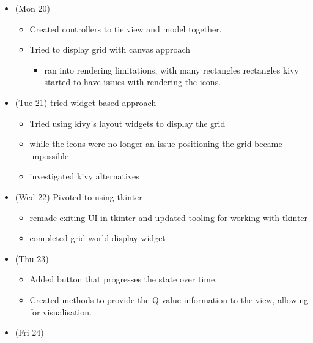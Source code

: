 \begin{itemize}
  \tightlist
  \item
        (Mon 20)

        \begin{itemize}
          \tightlist
          \item
                Created controllers to tie view and model together.
          \item
                Tried to display grid with canvas approach

                \begin{itemize}
                  \tightlist
                  \item
                        ran into rendering limitations, with many rectangles rectangles
                        kivy started to have issues with rendering the icons.
                \end{itemize}
        \end{itemize}
  \item
        (Tue 21) tried widget based approach

        \begin{itemize}
          \tightlist
          \item
                Tried using kivy's layout widgets to display the grid
          \item
                while the icons were no longer an issue positioning the grid became
                impossible
          \item
                investigated kivy alternatives
        \end{itemize}
  \item
        (Wed 22) Pivoted to using tkinter

        \begin{itemize}
          \tightlist
          \item
                remade exiting UI in tkinter and updated tooling for working with
                tkinter
          \item
                completed grid world display widget
        \end{itemize}
  \item
        (Thu 23)

        \begin{itemize}
          \tightlist
          \item
                Added button that progresses the state over time.
          \item
                Created methods to provide the Q-value information to the view,
                allowing for visualisation.
        \end{itemize}
  \item
        (Fri 24)


\end{itemize}
